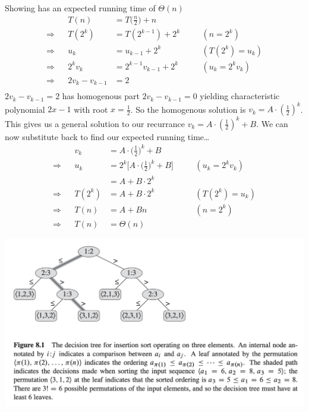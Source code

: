 \documentclass[11pt]{article}
\theoremstyle{definition}
\begin{document}
Showing  has an expected running time of \(\Theta(n)\)
\begin{align*}
  && T(n) &= T\Big(\frac{n}{2}\Big) + n && \\ 
  \Rightarrow && T(2^k) &= T(2^{k-1}) + 2^k && \quad (n = 2^k) \\ 
  \Rightarrow && u_k &= u_{k-1} + 2^k && \quad (T(2^k) = u_k) \\
  \Rightarrow && 2^k v_k &= 2^{k-1}v_{k-1} + 2^k && \quad (u_k = 2^k v_k) \\
  \Rightarrow && 2v_k - v_{k-1} &= 2 && \\
\end{align*}
\(2v_k - v_{k-1} = 2\) has homogenous part \(2v_k - v_{k-1} = 0\) yielding characteristic 
polynomial \(2x-1\) with root \(x=\frac{1}{2}\).  So the homogenous solution is 
\(v_k = A \cdot (\frac{1}{2})^k\).  This gives us a general solution to our recurrance 
\(v_k = A \cdot (\frac{1}{2})^k + B\).  We can now substitute back to find our 
 expected running time\dots
\begin{align*}
  && v_k &= A \cdot \Big(\frac{1}{2}\Big)^k + B && \\ 
  \Rightarrow && u_k &= 2^k\Big[A \cdot \Big(\frac{1}{2}\Big)^k + B\Big] && \quad (u_k = 2^k v_k) \\
  && &= A + B \cdot 2^k && \\
  \Rightarrow && T(2^k) &=  A + B \cdot 2^k && \quad (T(2^k) = u_k) \\
  \Rightarrow && T(n) &=  A + Bn && \quad (n = 2^k) \\
  \Rightarrow && T(n) &=  \Theta(n)
\end{align*}
\newpage

\includegraphics[scale=0.7]{images/decision_tree.png}
\end{document}
